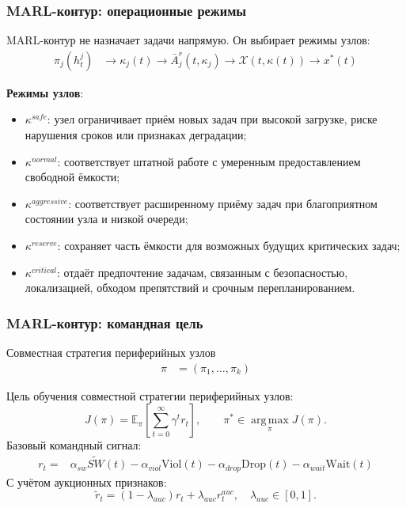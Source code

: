 \begin{frame}
	\frametitle{MARL-контур: операционные режимы}
	\small
	MARL-контур не назначает задачи напрямую. Он выбирает режимы узлов:
	\begin{align*}
		\pi_j( h^j_t)& \rightarrow \kappa_j(t) \rightarrow
		\bar{A}^{r}_j(t,\kappa_j) \rightarrow
		\mathcal{X}(t,\kappa(t)) \rightarrow x^*(t)
	\end{align*}

	\textbf{Режимы узлов}:
	\begin{itemize}
		\item $\kappa^{safe}$: узел ограничивает приём новых задач при высокой загрузке, риске нарушения сроков или признаках деградации;
		\item $\kappa^{normal}$: соответствует штатной работе с умеренным предоставлением свободной ёмкости;
		\item $\kappa^{aggressive}$: соответствует расширенному приёму задач при благоприятном состоянии узла и низкой очереди;
		\item $\kappa^{reserve}$: сохраняет часть ёмкости для возможных будущих критических задач;
		\item  $\kappa^{critical}$: отдаёт предпочтение задачам, связанным с безопасностью, локализацией, обходом препятствий и срочным перепланированием.
	\end{itemize}
\end{frame}

\begin{frame}
	\frametitle{MARL-контур: командная цель}
	\small
	Совместная стратегия периферийных узлов
	\begin{align*}
		\pi &= \left(\pi_1,\ldots,\pi_k\right)
	\end{align*}

	Цель обучения совместной стратегии периферийных узлов:
	\[
	J(\pi)=\mathbb{E}_{\pi}\left[\sum_{t=0}^{\infty}\gamma^t r_t\right],
	\qquad
	\pi^*\in\operatorname*{arg\,max}_{\pi}J(\pi).
	\]
	Базовый командный сигнал:
	\begin{align*}
		r_t ={}& \alpha_{sw}\widetilde{SW}(t)
		-\alpha_{viol}\mathrm{Viol}(t)
		-\alpha_{drop}\mathrm{Drop}(t)
		-\alpha_{wait}\mathrm{Wait}(t)
	\end{align*}
	С учётом аукционных признаков:
	\[
	\tilde{r}_t=(1-\lambda_{auc})r_t+\lambda_{auc}r^{auc}_t,
	\quad \lambda_{auc}\in[0,1].
	\]
\end{frame}

